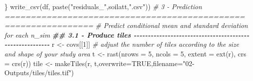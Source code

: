 \documentclass[
  10pt,
  b5paper,
  oneside]{book}
\newenvironment{Shaded}{\begin{snugshade}}{\end{snugshade}}
\newcommand{\AttributeTok}[1]{\textcolor[rgb]{0.77,0.63,0.00}{#1}}
\newcommand{\CommentTok}[1]{\textcolor[rgb]{0.56,0.35,0.01}{\textit{#1}}}
\newcommand{\ConstantTok}[1]{\textcolor[rgb]{0.00,0.00,0.00}{#1}}
\newcommand{\DecValTok}[1]{\textcolor[rgb]{0.00,0.00,0.81}{#1}}
\newcommand{\DocumentationTok}[1]{\textcolor[rgb]{0.56,0.35,0.01}{\textbf{\textit{#1}}}}
\newcommand{\FunctionTok}[1]{\textcolor[rgb]{0.00,0.00,0.00}{#1}}
\newcommand{\NormalTok}[1]{#1}
\newcommand{\OtherTok}[1]{\textcolor[rgb]{0.56,0.35,0.01}{#1}}
\newcommand{\StringTok}[1]{\textcolor[rgb]{0.31,0.60,0.02}{#1}}
\begin{document}
\begin{Shaded}
\begin{Highlighting}[]
\NormalTok{\}}
\FunctionTok{write\_csv}\NormalTok{(df, }\FunctionTok{paste}\NormalTok{(}\StringTok{"residuals\_"}\NormalTok{,soilatt,}\StringTok{".csv"}\NormalTok{))}
\CommentTok{\# 3 {-} Prediction ===============================================================}
\CommentTok{\# Predict conditional mean and standard deviation for each n\_sim  }
\DocumentationTok{\#\# 3.1 {-} Produce tiles {-}{-}{-}{-}{-}{-}{-}{-}{-}{-}{-}{-}{-}{-}{-}{-}{-}{-}{-}{-}{-}{-}{-}{-}{-}{-}{-}{-}{-}{-}{-}{-}{-}{-}{-}{-}{-}{-}{-}{-}{-}{-}{-}{-}{-}{-}{-}{-}{-}{-}{-}{-}{-}{-}{-}{-}{-}}
\NormalTok{r }\OtherTok{\textless{}{-}}\NormalTok{ covs[[}\DecValTok{1}\NormalTok{]]}
\CommentTok{\# adjust the number of tiles according to the size and shape of your study area}
\NormalTok{t }\OtherTok{\textless{}{-}} \FunctionTok{rast}\NormalTok{(}\AttributeTok{nrows =} \DecValTok{5}\NormalTok{, }\AttributeTok{ncols =} \DecValTok{5}\NormalTok{, }\AttributeTok{extent =} \FunctionTok{ext}\NormalTok{(r), }\AttributeTok{crs =} \FunctionTok{crs}\NormalTok{(r))}
\NormalTok{tile }\OtherTok{\textless{}{-}} \FunctionTok{makeTiles}\NormalTok{(r, t,}\AttributeTok{overwrite=}\ConstantTok{TRUE}\NormalTok{,}\AttributeTok{filename=}\StringTok{"02{-}Outputs/tiles/tiles.tif"}\NormalTok{)}


\end{Highlighting}
\end{Shaded}
\end{document}
